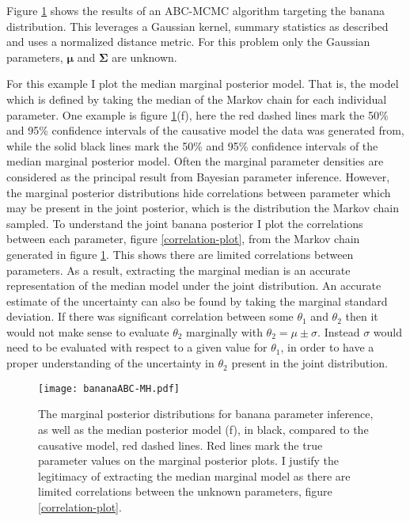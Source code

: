 Figure \ref{MH-banana} shows the results of an ABC-MCMC algorithm targeting the banana distribution. This leverages a Gaussian kernel, summary statistics as described and uses a normalized distance metric. For this problem only the Gaussian parameters, $\bm{\mu}$ and $\bm{\Sigma}$ are unknown.\par

For this example I plot the median marginal posterior model. That is, the model which is defined by taking the median of the Markov chain for each individual parameter. One example is figure \ref{MH-banana}(f), here the red dashed lines mark the 50\% and 95\% confidence intervals of the causative model the data was generated from, while the solid black lines mark the 50\% and 95\% confidence intervals of the median marginal posterior model. Often the marginal parameter densities are considered as the principal result from Bayesian parameter inference. However, the marginal posterior distributions hide correlations between parameter which may be present in the joint posterior, which is the distribution the Markov chain sampled. To understand the joint banana posterior I plot the correlations between each parameter, figure \ref{correlation-plot}, from the Markov chain generated in figure \ref{MH-banana}. This shows there are limited correlations between parameters. As a result, extracting the marginal median is an accurate representation of the median model under the joint distribution. An accurate estimate of the uncertainty can also be found by taking the marginal standard deviation. If there was significant correlation between some $\theta_1$ and $\theta_2$ then it would not make sense to evaluate $\theta_2$ marginally with $\theta_2 = \mu \pm \sigma$. Instead $\sigma$ would need to be evaluated with respect to a given value for $\theta_1$, in order to have a proper understanding of the uncertainty in $\theta_2$ present in the joint distribution. 


\begin{figure}[H]
	\centering
	\texttt{[image: bananaABC-MH.pdf]}
	\caption{The marginal posterior distributions for banana parameter inference, as well as the median posterior model (f), in black, compared to the causative model, red dashed lines. Red lines mark the true parameter values on the marginal posterior plots. I justify the legitimacy of extracting the median marginal model as there are limited correlations between the unknown parameters, figure \ref{correlation-plot}.}
	\label{MH-banana}
\end{figure}

